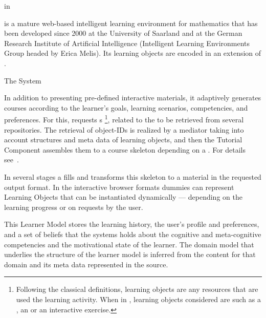 
\begin{omgroup}[id=activemath,short=ActiveMath,
  creators={melis,goguadse,alberto,frischauf,homik,libbrecht,cullrich}]
  {{\omdoc} in {\activemath}}

{\activemath} is a mature web-based intelligent learning environment for mathematics that
has been developed since 2000 at the University of Saarland and at the German Research
Institute of Artificial Intelligence (Intelligent Learning Environments Group headed by
Erica Melis). Its learning objects are encoded in an extension of {\omdoc}.

\begin{omgroup}{The {\activemath} System}

In addition to presenting pre-defined interactive materials, it adaptively generates
courses according to the learner's goals, learning scenarios, competencies, and
preferences. For this, {} requests
{s} \footnote{Following the classical definitions, learning
  objects are any resources that are used the learning activity. When in {\omdoc},
  learning objects considered are such as a , an  or
  an interactive exercise.}, related to the {} to be retrieved
from several repositories.  The retrieval of object-IDs is realized by a mediator taking
into account structures and meta data of learning objects, and then the Tutorial Component
assembles them to a course skeleton depending on a {}.  For
details
see~\cite{Ullrich-TutorialPlanningYRT-AIED-2005,Ullrich-InstructionalOntology-ISWC-2004}.

In several stages a {} fills and transforms this skeleton
to a material in the requested output format. In the interactive browser formats dummies
can represent Learning Objects that can be instantiated dynamically ---
depending on the learning progress or on requests by the user.

This Learner Model stores the learning history, the user's profile and preferences, and a
set of beliefs that the systems holds about the cognitive and meta-cognitive competencies
and the motivational state of the learner. The domain model that underlies the structure
of the learner model is inferred from the content for that domain and its meta data
represented in the {\omdoc} source.
 

\end{omgroup}
\end{omgroup}
